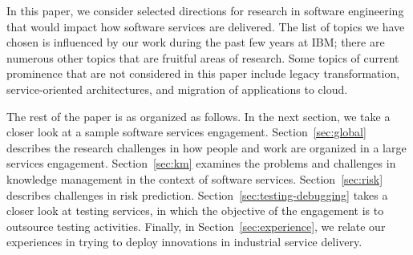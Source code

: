 
In this paper, we consider selected directions for research in software engineering that would impact how software services are delivered.  The list of topics we have chosen is influenced by our work during the past few years at IBM; there are numerous other topics that are fruitful areas of research.  Some topics of current prominence that are not considered in this paper include legacy transformation, service-oriented architectures, and migration of applications to cloud.


The rest of the paper is as organized as follows. In the next section, we take a closer look at a sample software services engagement.  Section~\ref{sec:global} describes the research challenges in how people and work are organized in a large services engagement.  Section~\ref{sec:km} examines the problems and challenges in knowledge management in the context of software services.  Section~\ref{sec:risk} describes challenges in risk prediction.  Section~\ref{sec:testing-debugging} takes a closer look at testing services, in which the objective of the engagement is to outsource testing activities.  Finally, in Section~\ref{sec:experience}, we relate our experiences in trying to deploy innovations in industrial service delivery.

\label{sec:intro}
